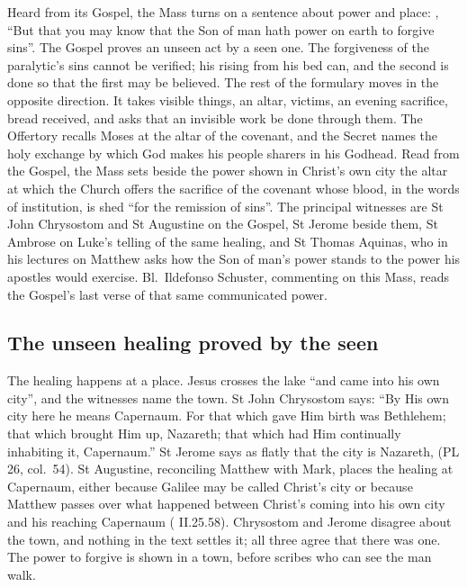 \label{sec:authority-on-earth}

Heard from its Gospel, the Mass turns on a sentence about power and place:
, ``But that you may know that the Son of man hath power on
earth to forgive sins''. The Gospel proves an unseen act by a seen one. The
forgiveness of the paralytic's sins cannot be verified; his rising from his bed
can, and the second is done so that the first may be believed. The rest of the
formulary moves in the opposite direction. It takes visible things, an altar,
victims, an evening sacrifice, bread received, and asks that an invisible work
be done through them. The Offertory recalls Moses at the altar of the covenant,
and the Secret names the holy exchange by which God makes his people sharers in
his Godhead. Read from the Gospel, the Mass sets beside the power shown in
Christ's own city the altar at which the Church offers the sacrifice of the covenant
whose blood, in the words of institution, is shed ``for the remission of sins''.
The principal witnesses are St John Chrysostom and St Augustine on the Gospel,
St Jerome beside them, St Ambrose on Luke's telling of the same healing, and St
Thomas Aquinas, who in his lectures on Matthew
asks how the Son of man's power stands to the power his apostles would
exercise. Bl.\ Ildefonso Schuster, commenting on this Mass, reads the Gospel's
last verse of that same communicated power.

\subsection{The unseen healing proved by the seen}

The healing happens at a place. Jesus crosses the lake ``and came into his own
city'', and the witnesses name the town. St John Chrysostom says: ``By His own
city here he means Capernaum. For that which gave Him birth was Bethlehem; that
which brought Him up, Nazareth; that which had Him continually inhabiting it,
Capernaum.'' St Jerome says as flatly that the city is Nazareth,
 (PL 26, col.~54). St Augustine,
reconciling Matthew with Mark, places the healing at Capernaum, either because
Galilee may be called Christ's city or because Matthew passes over what
happened between Christ's coming into his own city and his reaching Capernaum
( II.25.58). Chrysostom and Jerome disagree
about the town, and nothing in the text settles it; all three agree that there
was one. The power to forgive is shown in a town, before scribes who can see
the man walk.

